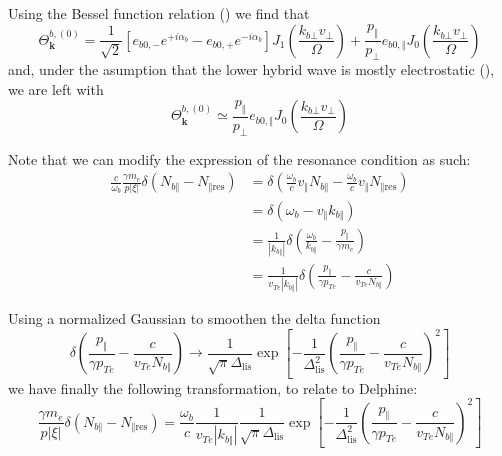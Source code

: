 Using the Bessel function relation () we find that%
\begin{equation}
\Theta_{\mathbf{k}}^{b,\left(  0\right)  }=\frac{1}{\sqrt{2}}\left[
e_{b0,-}e^{+i\alpha_{b}}-e_{b0,+}e^{-i\alpha_{b}}\right]  J_{1}\left(
\frac{k_{b\bot}v_{\bot}}{\Omega}\right)  +\frac{p_{\Vert}}{p_{\bot}%
}e_{b0,\Vert}J_{0}\left(  \frac{k_{b\bot}v_{\bot}}{\Omega}\right)
\end{equation}
and, under the asumption that the lower hybrid wave is mostly electrostatic
(), we are left with
\begin{equation}
\Theta_{\mathbf{k}}^{b,\left(  0\right)  }\simeq\frac{p_{\Vert}}{p_{\bot}%
}e_{b0,\Vert}J_{0}\left(  \frac{k_{b\bot}v_{\bot}}{\Omega}\right)
\end{equation}


Note that we can modify the expression of the resonance condition as such:%
\begin{align*}
\frac{c}{\omega_{b}}\frac{\gamma m_{e}}{p\left\vert \xi\right\vert }%
\delta\left(  N_{b\Vert}-N_{\Vert\text{res}}\right)   &  =\delta\left(
\frac{\omega_{b}}{c}v_{\Vert}N_{b\Vert}-\frac{\omega_{b}}{c}v_{\Vert}%
N_{\Vert\text{res}}\right) \\
&  =\delta\left(  \omega_{b}-v_{\Vert}k_{b\Vert}\right) \\
&  =\frac{1}{\left\vert k_{b\Vert}\right\vert }\delta\left(  \frac{\omega_{b}%
}{k_{b\Vert}}-\frac{p_{\Vert}}{\gamma m_{e}}\right) \\
&  =\frac{1}{v_{Te}\left\vert k_{b\Vert}\right\vert }\delta\left(
\frac{p_{\Vert}}{\gamma p_{Te}}-\frac{c}{v_{Te}N_{b\Vert}}\right)
\end{align*}


Using a normalized Gaussian to smoothen the delta function%
\[
\delta\left(  \frac{p_{\Vert}}{\gamma p_{Te}}-\frac{c}{v_{Te}N_{b\Vert}%
}\right)  \rightarrow\frac{1}{\sqrt{\pi}\Delta_{\text{lis}}}\exp\left[
-\frac{1}{\Delta_{\text{lis}}^{2}}\left(  \frac{p_{\Vert}}{\gamma p_{Te}%
}-\frac{c}{v_{Te}N_{b\Vert}}\right)  ^{2}\right]
\]
we have finally the following transformation, to relate to Delphine:%
\[
\frac{\gamma m_{e}}{p\left\vert \xi\right\vert }\delta\left(  N_{b\Vert
}-N_{\Vert\text{res}}\right)  =\frac{\omega_{b}}{c}\frac{1}{v_{Te}\left\vert
k_{b\Vert}\right\vert }\frac{1}{\sqrt{\pi}\Delta_{\text{lis}}}\exp\left[
-\frac{1}{\Delta_{\text{lis}}^{2}}\left(  \frac{p_{\Vert}}{\gamma p_{Te}%
}-\frac{c}{v_{Te}N_{b\Vert}}\right)  ^{2}\right]
\]


